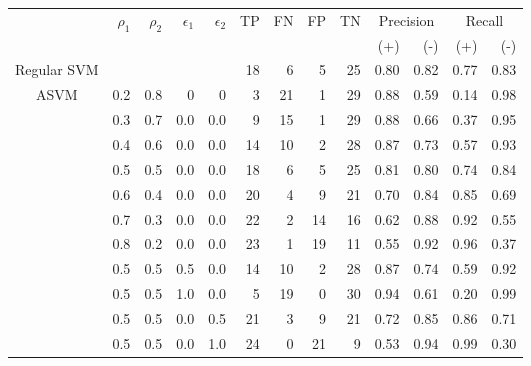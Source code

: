 \documentclass[twoside,11pt]{article}
\begin{document}
          


\begin{table}[htbp]\label{table:HeartDisease1}
  \centering
    \begin{tabular}{rrrrr|rrrrrrrr}
    \hline
    &\multirow{2}{*}{$\rho_1$} & \multirow{2}{*}{$\rho_2$} & \multirow{2}{*}{$\epsilon_1$} & \multirow{2}{*}{$\epsilon_2$} & \multirow{2}{*}{TP}    & \multirow{2}{*}{FN}    & \multirow{2}{*}{FP}    & \multirow{2}{*}{TN} & \multicolumn{2}{c}{Precision} & \multicolumn{2}{c}{Recall}\\
    &&&&&&&&&  (+) &  (-) &  (+) &  (-) \bigstrut\\
    \hline
    \hline
    \multicolumn{1}{c}{Regular SVM} &       &       &       &       & 18    & 6     & 5     & 25    & 0.80  & 0.82  & 0.77  & 0.83 \bigstrut\\
    \hline
    \multicolumn{1}{c}{\multirow{13}{*}{ASVM}} & 0.2   & 0.8   & 0     & 0     & 3     & 21    & 1     & 29    & 0.88  & 0.59  & 0.14  & 0.98 \bigstrut[t]\\
    \multicolumn{1}{c}{} & 0.3   & 0.7   & 0.0   & 0.0   & 9     & 15    & 1     & 29    & 0.88  & 0.66  & 0.37  & 0.95 \\
    \multicolumn{1}{c}{} & 0.4   & 0.6   & 0.0   & 0.0   & 14    & 10    & 2     & 28    & 0.87  & 0.73  & 0.57  & 0.93 \\
    \multicolumn{1}{c}{} & 0.5   & 0.5   & 0.0   & 0.0   & 18    & 6     & 5     & 25    & 0.81  & 0.80  & 0.74  & 0.84 \\
    \multicolumn{1}{c}{} & 0.6   & 0.4   & 0.0   & 0.0   & 20    & 4     & 9     & 21    & 0.70  & 0.84  & 0.85  & 0.69 \\
    \multicolumn{1}{c}{} & 0.7   & 0.3   & 0.0   & 0.0   & 22    & 2     & 14    & 16    & 0.62  & 0.88  & 0.92  & 0.55 \\
    \multicolumn{1}{c}{} & 0.8   & 0.2   & 0.0   & 0.0   & 23    & 1     & 19    & 11    & 0.55  & 0.92  & 0.96  & 0.37 \\
    \multicolumn{1}{c}{} & 0.5   & 0.5   & 0.5   & 0.0   & 14    & 10    & 2     & 28    & 0.87  & 0.74  & 0.59  & 0.92 \\
    \multicolumn{1}{c}{} & 0.5   & 0.5   & 1.0   & 0.0   & 5     & 19    & 0     & 30    & 0.94  & 0.61  & 0.20  & 0.99 \\
    \multicolumn{1}{c}{} & 0.5   & 0.5   & 0.0   & 0.5   & 21    & 3     & 9     & 21    & 0.72  & 0.85  & 0.86  & 0.71 \\
    \multicolumn{1}{c}{} & 0.5   & 0.5   & 0.0   & 1.0   & 24    & 0     & 21    & 9     & 0.53  & 0.94  & 0.99  & 0.30 \\

\end{tabular}
\end{table}
\end{document}

